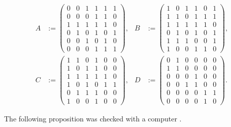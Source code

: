 \documentclass[dvipsnames]{article}
\theoremstyle{definition}
\theoremstyle{remark}
\DeclareMathOperator{\FF}{\mathbb F}
\begin{document}
    \begin{table}\label{tbl:matrices}
    \begin{align*}
        A &:= \begin{pmatrix}
          0 & 0 & 1 & 1 & 1 & 1 \\
          0 & 0 & 0 & 1 & 1 & 0 \\
          1 & 1 & 1 & 1 & 1 & 0 \\
          0 & 1 & 0 & 1 & 0 & 1 \\
          0 & 0 & 1 & 0 & 1 & 0 \\
          0 & 0 & 0 & 1 & 1 & 1
        \end{pmatrix},
        &
        B &:= \begin{pmatrix}
          1 & 0 & 1 & 1 & 0 & 1 \\
          1 & 1 & 0 & 1 & 1 & 1 \\
          1 & 1 & 1 & 1 & 1 & 0 \\
          0 & 1 & 0 & 1 & 0 & 1 \\
          1 & 1 & 1 & 0 & 0 & 1 \\
          1 & 0 & 0 & 1 & 1 & 0
        \end{pmatrix},\\
        C &:= \begin{pmatrix}
          1 & 1 & 0 & 1 & 0 & 0 \\
          1 & 0 & 1 & 1 & 0 & 0 \\
          1 & 1 & 1 & 1 & 1 & 0 \\
          1 & 0 & 1 & 0 & 1 & 1 \\
          0 & 1 & 1 & 1 & 0 & 0 \\
          1 & 0 & 0 & 1 & 0 & 0
        \end{pmatrix},
        &
        D &:= \begin{pmatrix}
            0 & 1 & 0 & 0 & 0 & 0 \\
            1 & 1 & 0 & 0 & 0 & 0 \\
            0 & 0 & 0 & 1 & 0 & 0 \\
            0 & 0 & 1 & 1 & 0 & 0 \\
            0 & 0 & 0 & 0 & 1 & 1 \\
            0 & 0 & 0 & 0 & 1 & 0
        \end{pmatrix}.
    \end{align*}
        \caption{Matrices over $\FF_2$.}
        \label{tbl:matrices}
    \end{table}

    The following proposition was checked with a computer \cite{ChamberRegularCode}.
\end{document}
